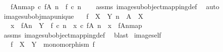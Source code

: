 \begin{isabellebody}
\ \ \ {\isachardoublequoteopen}{\isacharbrackleft}{\kern0pt}f{\isasymlparr}A{\isasymrparr}\isactrlbsub n\isactrlesub {\isacharbrackright}{\kern0pt}map\ {\isasymcirc}\isactrlsub c\ {\isacharparenleft}{\kern0pt}f{\isasymrestriction}\isactrlbsub {\isacharparenleft}{\kern0pt}A{\isacharcomma}{\kern0pt}\ n{\isacharparenright}{\kern0pt}\isactrlesub {\isacharparenright}{\kern0pt}\ {\isacharequal}{\kern0pt}\ f\ {\isasymcirc}\isactrlsub c\ n{\isachardoublequoteclose}\isanewline
%
\isadelimproof
\ \ %
\endisadelimproof
%
\isatagproof
{}\isamarkupfalse%
\ assms\ image{\isacharunderscore}{\kern0pt}subobject{\isacharunderscore}{\kern0pt}mapping{\isacharunderscore}{\kern0pt}def{}\ \isamarkupfalse%
\ auto%
\endisatagproof
{\isafoldproof}%
%
\isadelimproof
\isanewline
%
\endisadelimproof
\isanewline
{}\isamarkupfalse%
\ image{\isacharunderscore}{\kern0pt}subobj{\isacharunderscore}{\kern0pt}map{\isacharunderscore}{\kern0pt}unique{\isacharcolon}{\kern0pt}\isanewline
\ \ \ {\isachardoublequoteopen}f\ {\isacharcolon}{\kern0pt}\ X\ {\isasymrightarrow}\ Y{\isachardoublequoteclose}\ {\isachardoublequoteopen}n\ {\isacharcolon}{\kern0pt}\ A\ {\isasymrightarrow}\ X{\isachardoublequoteclose}\isanewline
\ \ \ {\isachardoublequoteopen}x\ {\isacharcolon}{\kern0pt}\ f{\isasymlparr}A{\isasymrparr}\isactrlbsub n\isactrlesub \ {\isasymrightarrow}\ Y\ {\isasymLongrightarrow}\ f\ {\isasymcirc}\isactrlsub c\ n\ {\isacharequal}{\kern0pt}\ x\ {\isasymcirc}\isactrlsub c\ {\isacharparenleft}{\kern0pt}f{\isasymrestriction}\isactrlbsub {\isacharparenleft}{\kern0pt}A{\isacharcomma}{\kern0pt}\ n{\isacharparenright}{\kern0pt}\isactrlesub {\isacharparenright}{\kern0pt}\ {\isasymLongrightarrow}\ x\ {\isacharequal}{\kern0pt}\ {\isacharbrackleft}{\kern0pt}f{\isasymlparr}A{\isasymrparr}\isactrlbsub n\isactrlesub {\isacharbrackright}{\kern0pt}map{\isachardoublequoteclose}\isanewline
%
\isadelimproof
\ \ %
\endisadelimproof
%
\isatagproof
{}\isamarkupfalse%
\ assms\ image{\isacharunderscore}{\kern0pt}subobject{\isacharunderscore}{\kern0pt}mapping{\isacharunderscore}{\kern0pt}def{}\ \isamarkupfalse%
\ blast%
\endisatagproof
{\isafoldproof}%
%
\isadelimproof
\isanewline
%
\endisadelimproof
\isanewline
{}\isamarkupfalse%
\ image{\isacharunderscore}{\kern0pt}self{\isacharcolon}{\kern0pt}\isanewline
\ \ \ {\isachardoublequoteopen}f\ {\isacharcolon}{\kern0pt}\ X\ {\isasymrightarrow}\ Y{\isachardoublequoteclose}\ \ {\isachardoublequoteopen}monomorphism\ f{\isachardoublequoteclose}\isanewline

\end{isabellebody}
